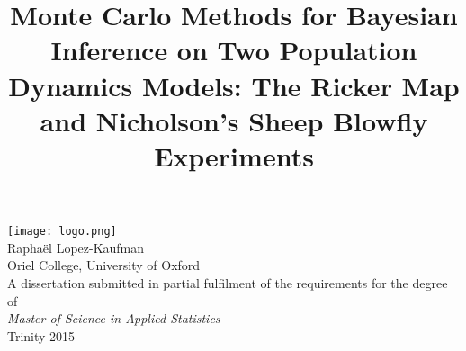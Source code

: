 \documentclass[12pt]{article}
\title{Monte Carlo Methods for Bayesian Inference on Two Population
	Dynamics Models: The Ricker Map and Nicholson's Sheep Blowfly Experiments}
\date{}
\begin{document}
	\maketitle 
	\thispagestyle{empty}
	\begin{center}
		\vspace{-5mm}
		\texttt{[image: logo.png]} \\
		\vspace{20mm}
		{\large Raphaël Lopez-Kaufman} \\
		\vspace{2mm}
		{\large Oriel College, University of Oxford} \\
		\vspace{50mm}
		A dissertation submitted in partial fulfilment of the requirements for the degree of \\
		\vspace{1mm}
		\textit{Master of Science in Applied Statistics} \\
		\vspace{1mm}
		Trinity 2015
	\end{center}
	
	\vspace{25 mm}
	
\end{document}
